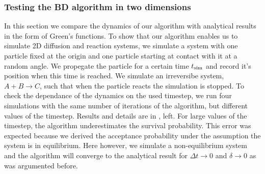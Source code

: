 \subsubsection{Testing the BD algorithm in two dimensions}

In this section we compare the dynamics of our algorithm with analytical results in the form of Green's functions. To show that our algorithm enables us to simulate 2D diffusion and reaction systems, we simulate a system with one particle fixed at the origin and one particle starting at contact with it at a random angle. We propegate the particle for a certain time $t_{\rm sim}$ and record it's position when this time is reached. We simulate an irreversibe system, $A + B \rightarrow C$, such that when the particle reacts the simulation is stopped. To check the dependance of the dynamics on the used timestep, we run four simulations with the same number of iterations of the algorithm, but different values of the timestep. Results and details are in , left. For large values of the timestep, the algorithm underestimates the survival probability. This error was expected because we derived the acceptance probability under the assumption the system is in equilibrium. Here however, we simulate a non-equilibrium system and the algorithm will converge to the analytical result for $\Delta t \to 0$ and $\delta \to 0$ as was argumented before.

